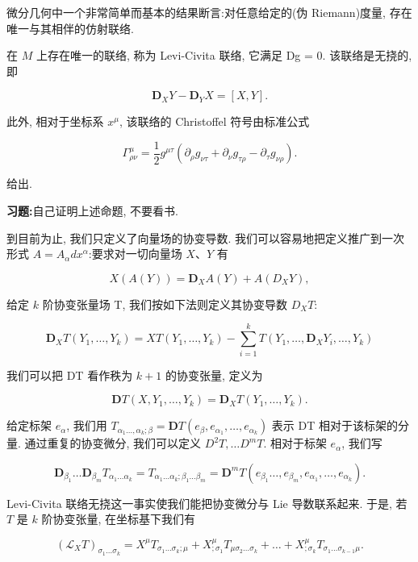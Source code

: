 微分几何中一个非常简单而基本的结果断言:对任意给定的(伪 Riemann)度量, 存在唯一与其相伴的仿射联络.

\begin{proposition}\label{prop:cA-2.6}
在 $M$ 上存在唯一的联络, 称为 Levi-Civita 联络, 它满足 Dg = 0. 该联络是无挠的, 即

\[
\mathbf{D}_{X}Y - \mathbf{D}_{Y}X = [X, Y].
\]

此外, 相对于坐标系 $x^{\mu}$, 该联络的 Christoffel 符号由标准公式

\[
\Gamma^{\mu}_{\rho\nu} = \frac{1}{2}g^{\mu\tau}\left(\partial_{\rho}g_{\nu\tau} + \partial_{\nu}g_{\tau\rho} - \partial_{\tau}g_{\nu\rho}\right).
\]

给出.
\end{proposition}

\par\noindent\textbf{习题:}自己证明上述命题, 不要看书.

到目前为止, 我们只定义了向量场的协变导数. 我们可以容易地把定义推广到一次形式 $A = A_{\alpha}dx^{\alpha}$:要求对一切向量场 $X$、$Y$ 有

\[
X(A(Y)) = \mathbf{D}_{X}A(Y) + A(D_{X}Y),
\]

给定 $k$ 阶协变张量场 T, 我们按如下法则定义其协变导数 $D_{X}T$:

\[
\mathbf{D}_{X}T(Y_{1}, \dots, Y_{k}) = XT(Y_{1}, \dots, Y_{k}) - \sum_{i=1}^{k} T(Y_{1}, \dots, \mathbf{D}_{X}Y_{i}, \dots, Y_{k})
\]

我们可以把 DT 看作秩为 $k+1$ 的协变张量, 定义为

\[
\mathbf{D}T(X, Y_{1}, \dots, Y_{k}) = \mathbf{D}_{X}T(Y_{1}, \dots, Y_{k}).
\]

给定标架 $e_{\alpha}$, 我们用 $T_{\alpha_{1}\ldots, \alpha_{k};\beta} = \mathbf{D}T(e_{\beta}, e_{\alpha_{1}}, \ldots, e_{\alpha_{k}})$ 表示 DT 相对于该标架的分量. 通过重复的协变微分, 我们可以定义 $D^{2}T, \ldots D^{m}T$. 相对于标架 $e_{\alpha}$, 我们写

\[
\mathbf{D}_{\beta_{1}}\dots\mathbf{D}_{\beta_{m}}T_{\alpha_{1}\dots\alpha_{k}} = T_{\alpha_{1}\dots\alpha_{k};\beta_{1}\dots\beta_{m}} = \mathbf{D}^{m}T(e_{\beta_{1}}\dots, e_{\beta_{m}}, e_{\alpha_{1}}, \dots, e_{\alpha_{k}}).
\]

Levi-Civita 联络无挠这一事实使我们能把协变微分与 Lie 导数联系起来. 于是, 若 $T$ 是 $k$ 阶协变张量, 在坐标基下我们有

\[
(\mathcal{L}_{X}T)_{\sigma_{1}\ldots\sigma_{k}} = X^{\mu}T_{\sigma_{1}\ldots\sigma_{k};\mu} + X^{\mu}_{;\sigma_{1}}T_{\mu\sigma_{2}\ldots\sigma_{k}} + \ldots + X^{\mu}_{;\sigma_{k}}T_{\sigma_{1}\ldots\sigma_{k-1}\mu}.
\]

